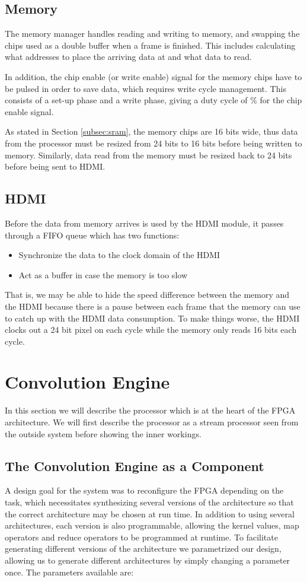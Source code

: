 \subsection{Memory}
The memory manager handles reading and writing to memory, and swapping the chips used as a double buffer when a frame is finished.
This includes calculating what addresses to place the arriving data at and what data to read.

In addition, the chip enable (or write enable) signal for the memory chips have to be pulsed in order to save data, which requires write cycle management.
This consists of a set-up phase and a write phase, giving a duty cycle of \unit[50]{\%} for the chip enable signal.

As stated in Section \ref{subsec:sram}, the memory chips are 16 bits wide, thus data from the processor must be resized from 24 bits to 16 bits before being written to memory.
Similarly, data read from the memory must be resized back to 24 bits before being sent to HDMI.

\subsection{HDMI}
Before the data from memory arrives is used by the HDMI module, it passes through a FIFO queue which has two functions:
\begin{itemize}
    \item Synchronize the data to the clock domain of the HDMI
    \item Act as a buffer in case the memory is too slow
\end{itemize}

That is, we may be able to hide the speed difference between the memory and the HDMI because there is a pause between each frame that the memory can use to catch up with the HDMI data consumption.
To make things worse, the HDMI clocks out a 24 bit pixel on each cycle while the memory only reads 16 bits each cycle.

\section{Convolution Engine}
\label{sec:processor}
In this section we will describe the processor which is at the heart of the FPGA architecture.
We will first describe the processor as a stream processor seen from the outside system before showing the inner workings.

\subsection{The Convolution Engine as a Component}
A design goal for the system was to reconfigure the FPGA depending on the task, which necessitates synthesizing several versions of the architecture so that the correct architecture may be chosen at run time.
In addition to using several architectures, each version is also programmable, allowing the kernel values, map operators and reduce operators to be programmed at runtime.
To facilitate generating different versions of the architecture we parametrized our design, allowing us to generate different architectures by simply changing a parameter once.
The parameters available are:

